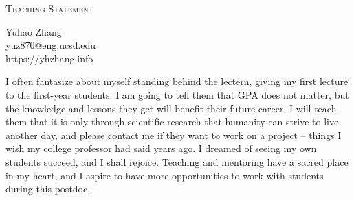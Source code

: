 \documentclass[letterpaper]{article}
\makeatletter
\newcommand{\soptitle}{Teaching Statement}
\newcommand{\yourname}{Yuhao Zhang}
\newcommand{\youremail}{yuz870@eng.ucsd.edu}
\newcommand{\amper}{{\fontspec[Scale=1]{Adobe Caslon Pro}\selectfont\itshape\&~{}}}
\makeatother
\begin{document}
\begin{center}{\huge \scshape \soptitle}\end{center}
\begin{center}\vspace{0.2em} {\Large \yourname\\}
  {\youremail\\} {https://yhzhang.info}\end{center}

\noindent I often fantasize about myself standing behind the lectern, giving my first lecture to the first-year students. I am going to tell them that GPA does not matter, but the knowledge and lessons they get will benefit their future career. I will teach them that it is only through scientific research that humanity can strive to live another day, and please contact me if they want to work on a project -- things I wish my college professor had said years ago. I dreamed of seeing my own students succeed, and I shall rejoice. Teaching and mentoring have a sacred place in my heart, and I aspire to have more opportunities to work with students during this postdoc.
\end{document}
